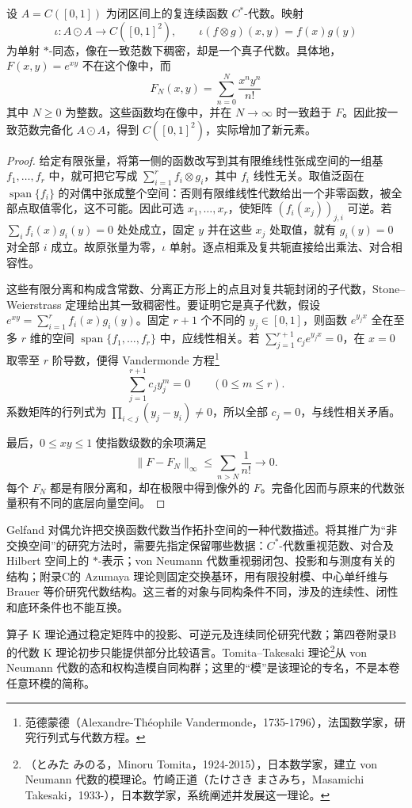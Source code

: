 \begin{proposition}\label{b2:prop:D-tensor-completion}
	设 \(A=C([0,1])\) 为闭区间上的复连续函数 \(C^*\)-代数。映射
	\[
		\iota:A\odot A\longrightarrow C([0,1]^2),\qquad \iota(f\otimes g)(x,y)=f(x)g(y)
	\]
	为单射 \(*\)-同态，像在一致范数下稠密，却是一个真子代数。具体地，\(F(x,y)=e^{xy}\) 不在这个像中，而
	\[
		F_N(x,y)=\sum_{n=0}^N\frac{x^ny^n}{n!}
	\]
	其中 \(N\ge0\) 为整数。这些函数均在像中，并在 \(N\to\infty\) 时一致趋于 \(F\)。因此按一致范数完备化 \(A\odot A\)，得到 \(C([0,1]^2)\)，实际增加了新元素。
\end{proposition}
\begin{proof}
	给定有限张量，将第一侧的函数改写到其有限维线性张成空间的一组基 \(f_1,\ldots,f_r\) 中，就可把它写成 \(\sum_{i=1}^r f_i\otimes g_i\)，其中 \(f_i\) 线性无关。取值泛函在 \(\operatorname{span}\{f_i\}\) 的对偶中张成整个空间：否则有限维线性代数给出一个非零函数，被全部点取值零化，这不可能。因此可选 \(x_1,\ldots,x_r\)，使矩阵 \((f_i(x_j))_{j,i}\) 可逆。若 \(\sum_i f_i(x)g_i(y)=0\) 处处成立，固定 \(y\) 并在这些 \(x_j\) 处取值，就有 \(g_i(y)=0\) 对全部 \(i\) 成立。故原张量为零，\(\iota\) 单射。逐点相乘及复共轭直接给出乘法、对合相容性。

	这些有限分离和构成含常数、分离正方形上的点且对复共轭封闭的子代数，Stone--Weierstrass 定理给出其一致稠密性。要证明它是真子代数，假设 \(e^{xy}=\sum_{i=1}^r f_i(x)g_i(y)\)。固定 \(r+1\) 个不同的 \(y_j\in[0,1]\)，则函数 \(e^{y_jx}\) 全在至多 \(r\) 维的空间 \(\operatorname{span}\{f_1,\ldots,f_r\}\) 中，应线性相关。若 \(\sum_{j=1}^{r+1}c_je^{y_jx}=0\)，在 \(x=0\) 取零至 \(r\) 阶导数，便得 Vandermonde 方程\footnote{范德蒙德（Alexandre-Théophile Vandermonde，1735-1796），法国数学家，研究行列式与代数方程。}
	\[
		\sum_{j=1}^{r+1}c_jy_j^m=0\qquad(0\le m\le r).
	\]
	系数矩阵的行列式为 \(\prod_{i<j}(y_j-y_i)\ne0\)，所以全部 \(c_j=0\)，与线性相关矛盾。

	最后，\(0\le xy\le1\) 使指数级数的余项满足
	\[
		\|F-F_N\|_\infty\le\sum_{n>N}\frac1{n!}\longrightarrow0.
	\]
	每个 \(F_N\) 都是有限分离和，却在极限中得到像外的 \(F\)。完备化因而与原来的代数张量积有不同的底层向量空间。
\end{proof}

Gelfand 对偶允许把交换函数代数当作拓扑空间的一种代数描述。将其推广为“非交换空间”的研究方法时，需要先指定保留哪些数据：\(C^*\)-代数重视范数、对合及 Hilbert 空间上的 \(*\)-表示；von Neumann 代数重视弱闭包、投影和与测度有关的结构；附录C的 Azumaya 理论则固定交换基环，用有限投射模、中心单纤维与 Brauer 等价研究代数结构。这三者的对象与同构条件不同，涉及的连续性、闭性和底环条件也不能互换。

\ProseParagraphBreak
算子 K 理论通过稳定矩阵中的投影、可逆元及连续同伦研究代数；第四卷附录B的代数 K 理论初步只能提供部分比较语言。Tomita--Takesaki 理论\footnote{（とみた みのる，Minoru Tomita，1924-2015），日本数学家，建立 von Neumann 代数的模理论。竹崎正道（たけさき まさみち，Masamichi Takesaki，1933-），日本数学家，系统阐述并发展这一理论。}从 von Neumann 代数的态和权构造模自同构群；这里的“模”是该理论的专名，不是本卷任意环模的简称。
